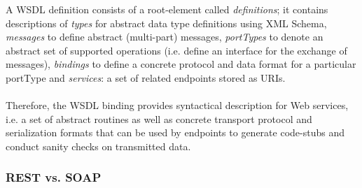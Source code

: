 A WSDL definition consists of a root-element called \emph{definitions}; it contains descriptions of \emph{types} for abstract data type definitions using XML Schema, \emph{messages} to define abstract (multi-part) messages, \emph{portTypes} to denote an abstract set of supported operations (i.e. define an interface for the exchange of messages), \emph{bindings} to define a concrete protocol and data format for a particular portType and \emph{services}: a set of related endpoints stored as URIs.
\\ \\
Therefore, the WSDL binding provides syntactical description for Web services, i.e. a set of abstract routines as well as concrete transport protocol and serialization formats that can be used by endpoints to generate code-stubs and conduct sanity checks on transmitted data. \cite{BIGREST}

\subsubsection{REST vs. SOAP}

